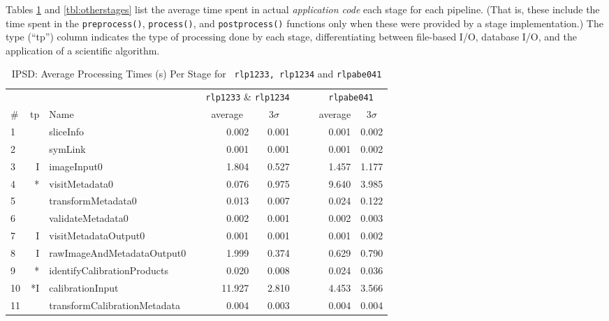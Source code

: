 Tables \ref{tbl:ipsdstages} and \ref{tbl:otherstages} list the average
time spent in actual {\it application code} each stage for each pipeline.
(That is, these include the time spent in the {\tt preprocess()}, 
{\tt process()}, and {\tt postprocess()} functions only when these
were provided by a stage implementation.)  The type (``tp'') column
indicates the type of processing done by each stage, differentiating
between file-based I/O, database I/O, and the application of a
scientific algorithm.  

\begin{table}[htbp]
\begin{center}
\caption{IPSD: Average Processing Times (s) Per Stage for {\tt
    rlp1233, rlp1234} and {\tt rlpabe041}
\label{tbl:ipsdstages}}
\small
\vspace{\baselineskip}
\begin{tabular}{lrlcrrc|crr}
\hline\hline
   &    &      && \multicolumn{2}{c}{{\tt rlp1233} \& {\tt rlp1234}} 
              &&& \multicolumn{2}{c}{{\tt rlpabe041}} \\
\# & tp & Name && \multicolumn{1}{c}{average}&\multicolumn{1}{c}{$3\sigma$} 
              &&& \multicolumn{1}{c}{average}&\multicolumn{1}{c}{$3\sigma$} \\ 
\hline
 1 &    &                     sliceInfo &&  0.002 &  0.001 &&&  0.001 &  0.002 \\
 2 &    &                       symLink &&  0.001 &  0.001 &&&  0.001 &  0.002 \\
 3 &  I &                   imageInput0 &&  1.804 &  0.527 &&&  1.457 &  1.177 \\
 4 & *  &                visitMetadata0 &&  0.076 &  0.975 &&&  9.640 &  3.985 \\
 5 &    &            transformMetadata0 &&  0.013 &  0.007 &&&  0.024 &  0.122 \\
 6 &    &             validateMetadata0 &&  0.002 &  0.001 &&&  0.002 &  0.003 \\
 7 &  I &          visitMetadataOutput0 &&  0.001 &  0.001 &&&  0.001 &  0.002 \\
 8 &  I &    rawImageAndMetadataOutput0 &&  1.999 &  0.374 &&&  0.629 &  0.790 \\
 9 & *  &   identifyCalibrationProducts &&  0.020 &  0.008 &&&  0.024 &  0.036 \\
10 & *I &              calibrationInput && 11.927 &  2.810 &&&  4.453 &  3.566 \\
11 &    &  transformCalibrationMetadata &&  0.004 &  0.003 &&&  0.004 &  0.004 \\

\end{tabular}
\end{center}
\end{table}

